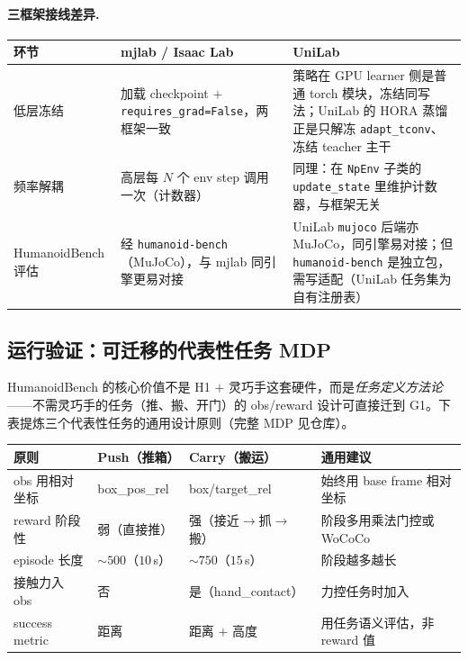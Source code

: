 \paragraph{三框架接线差异.}

\begin{center}
\small
\begin{tabular}{p{2.0cm}p{4.3cm}p{4.3cm}}
\hline
环节 & mjlab / Isaac Lab & UniLab \\
\hline
低层冻结 & 加载 checkpoint $+$ \texttt{requires\_grad=False}，两框架一致 & 策略在 GPU learner 侧是普通 torch 模块，冻结同写法；UniLab 的 HORA 蒸馏正是只解冻 \verb|adapt_tconv|、冻结 teacher 主干\cite{unilab2026} \\
频率解耦 & 高层每 $N$ 个 env step 调用一次（计数器） & 同理：在 \texttt{NpEnv} 子类的 \verb|update_state| 里维护计数器，与框架无关 \\
HumanoidBench 评估 & 经 \texttt{humanoid-bench}（MuJoCo），与 mjlab 同引擎更易对接 & UniLab \texttt{mujoco} 后端亦 MuJoCo，同引擎易对接；但 \texttt{humanoid-bench} 是独立包，需写适配（UniLab 任务集为自有注册表） \\
\hline
\end{tabular}
\end{center}

\subsection{运行验证：可迁移的代表性任务 MDP}
HumanoidBench 的核心价值不是 H1 $+$ 灵巧手这套硬件，而是\emph{任务定义方法论}——不需灵巧手的任务（推、搬、开门）的 obs/reward 设计可直接迁到 G1。下表提炼三个代表性任务的通用设计原则（完整 MDP 见仓库）。

\begin{center}
\small
\begin{tabular}{p{2.6cm}p{2.4cm}p{2.4cm}p{3.4cm}}
\hline
原则 & Push（推箱） & Carry（搬运） & 通用建议 \\
\hline
obs 用相对坐标 & box\_pos\_rel & box/target\_rel & 始终用 base frame 相对坐标 \\
reward 阶段性 & 弱（直接推） & 强（接近$\to$抓$\to$搬） & 阶段多用乘法门控或 WoCoCo \\
episode 长度 & $\sim 500$（$10$\,s） & $\sim 750$（$15$\,s） & 阶段越多越长 \\
接触力入 obs & 否 & 是（hand\_contact） & 力控任务时加入 \\
success metric & 距离 & 距离 $+$ 高度 & 用任务语义评估，非 reward 值 \\
\hline
\end{tabular}
\end{center}


